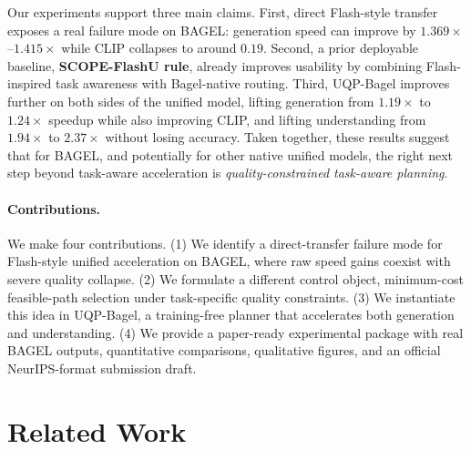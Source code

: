 \documentclass{article}
\begin{document}
Our experiments support three main claims. First, direct Flash-style transfer exposes a real failure mode on BAGEL: generation speed can improve by $1.369\times$--$1.415\times$ while CLIP collapses to around $0.19$. Second, a prior deployable baseline, \textbf{SCOPE-FlashU rule}, already improves usability by combining Flash-inspired task awareness with Bagel-native routing. Third, UQP-Bagel improves further on both sides of the unified model, lifting generation from $1.19\times$ to $1.24\times$ speedup while also improving CLIP, and lifting understanding from $1.94\times$ to $2.37\times$ without losing accuracy. Taken together, these results suggest that for BAGEL, and potentially for other native unified models, the right next step beyond task-aware acceleration is \emph{quality-constrained task-aware planning}.

\paragraph{Contributions.} We make four contributions. (1) We identify a direct-transfer failure mode for Flash-style unified acceleration on BAGEL, where raw speed gains coexist with severe quality collapse. (2) We formulate a different control object, minimum-cost feasible-path selection under task-specific quality constraints. (3) We instantiate this idea in UQP-Bagel, a training-free planner that accelerates both generation and understanding. (4) We provide a paper-ready experimental package with real BAGEL outputs, quantitative comparisons, qualitative figures, and an official NeurIPS-format submission draft.

\section{Related Work}
\end{document}
